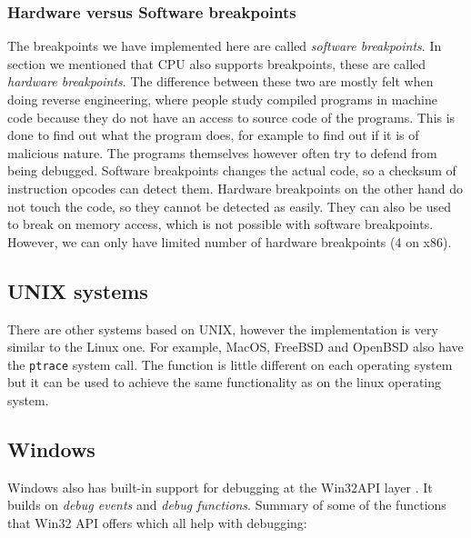 \subsubsection*{Hardware versus Software breakpoints}
The breakpoints we have implemented here are called \textit{software
breakpoints}. In section  we mentioned that CPU also supports
breakpoints, these are called \textit{hardware breakpoints}. The difference
between these two are mostly felt when doing reverse engineering, where people
study compiled programs in machine code because they do not have an access to
source code of the programs. This is done to find out what the program does,
for example to find out if it is of malicious nature. The programs themselves
however often try to defend from being debugged. Software breakpoints changes
the actual code, so a checksum of instruction opcodes can detect them. Hardware
breakpoints on the other hand do not touch the code, so they cannot be detected
as easily. They can also be used to break on memory access, which is not
possible with software breakpoints. However, we can only have limited number of
hardware breakpoints (4 on x86).


\subsection{UNIX systems}
There are other systems based on UNIX, however the implementation is very similar to the Linux one.
For example, MacOS, FreeBSD and OpenBSD also have the \texttt{ptrace} system call. The function is
little different on each operating system but it can be used to achieve the same functionality as
on the linux operating system.

\subsection{Windows}
Windows also has built-in support for debugging at the Win32API layer
\cite{windows-msdn-debugging-api, windows-press-debugging-api}. It builds on
\textit{debug events} and \textit{debug functions}. Summary of some of the
functions that Win32 API offers which all help with debugging:

